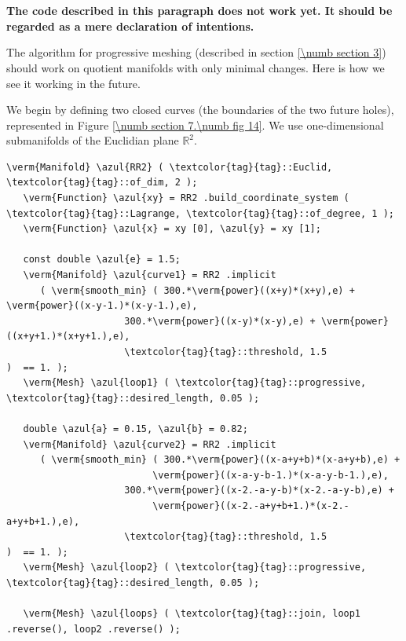 \section{~~}
\label{\numb section 7.\numb parag 19}

{\normalfont\bfseries The code described in this paragraph does not work yet.
It should be regarded as a mere declaration of intentions.}
\medskip
{}

The algorithm for progressive meshing (described in section \ref{\numb section 3})
should work on quotient manifolds with only minimal changes.
Here is how we see it working in the future.

We begin by defining two closed curves (the boundaries of the two future holes),
represented in Figure \ref{\numb section 7.\numb fig 14}.
We use one-dimensional submanifolds of the Euclidian plane $ \mathbb{R}^2 $.

\begin{Verbatim}[commandchars=\\\{\},formatcom=\small\tt,frame=single,
   rulecolor=\color{coment},baselinestretch=0.94,framesep=2mm         ]
   \verm{Manifold} \azul{RR2} ( \textcolor{tag}{tag}::Euclid, \textcolor{tag}{tag}::of_dim, 2 );
   \verm{Function} \azul{xy} = RR2 .build_coordinate_system ( \textcolor{tag}{tag}::Lagrange, \textcolor{tag}{tag}::of_degree, 1 );
   \verm{Function} \azul{x} = xy [0], \azul{y} = xy [1];
   
   const double \azul{e} = 1.5;
   \verm{Manifold} \azul{curve1} = RR2 .implicit 
      ( \verm{smooth_min} ( 300.*\verm{power}((x+y)*(x+y),e) + \verm{power}((x-y-1.)*(x-y-1.),e),
                     300.*\verm{power}((x-y)*(x-y),e) + \verm{power}((x+y+1.)*(x+y+1.),e),
                     \textcolor{tag}{tag}::threshold, 1.5                     )  == 1. );
   \verm{Mesh} \azul{loop1} ( \textcolor{tag}{tag}::progressive, \textcolor{tag}{tag}::desired_length, 0.05 );
      
   double \azul{a} = 0.15, \azul{b} = 0.82;
   \verm{Manifold} \azul{curve2} = RR2 .implicit 
      ( \verm{smooth_min} ( 300.*\verm{power}((x-a+y+b)*(x-a+y+b),e) +
                          \verm{power}((x-a-y-b-1.)*(x-a-y-b-1.),e),
                     300.*\verm{power}((x-2.-a-y-b)*(x-2.-a-y-b),e) +
                          \verm{power}((x-2.-a+y+b+1.)*(x-2.-a+y+b+1.),e),
                     \textcolor{tag}{tag}::threshold, 1.5                           )  == 1. );
   \verm{Mesh} \azul{loop2} ( \textcolor{tag}{tag}::progressive, \textcolor{tag}{tag}::desired_length, 0.05 );

   \verm{Mesh} \azul{loops} ( \textcolor{tag}{tag}::join, loop1 .reverse(), loop2 .reverse() );                     
\end{Verbatim}

